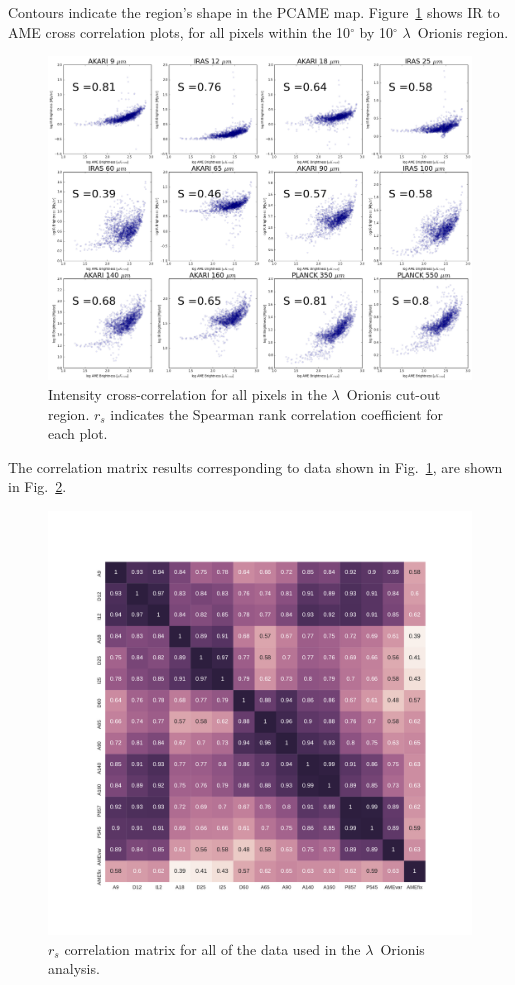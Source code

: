			Contours indicate the region's shape in the PCAME map. Figure~\ref{fig:orionis-corr} shows IR to AME cross correlation plots, for all pixels within the 10$^{\circ}$ by 10$^{\circ}$ $\lambda$~Orionis region.
        \begin{figure}
          \includegraphics[width=\textwidth]{../Plots/orionis_correlations_AME.png}
          \centering
          \caption{Intensity cross-correlation for all pixels in the $\lambda$~Orionis cut-out region.  $r_{s}$ indicates the Spearman rank correlation coefficient for each plot.}
          \label{fig:orionis-corr}
        \end{figure}
    The correlation matrix results corresponding to data shown in Fig.~\ref{fig:orionis-corr}, are shown in Fig.~\ref{fig:orionis-corr-matrix}.
        \begin{figure}
          \includegraphics[width=\textwidth]{../Plots/ch_lori/Lori_corrmatrix_I.pdf}
          \centering
          \caption{$r_{s}$ correlation matrix for all of the data used in the $\lambda$~Orionis analysis.}
          \label{fig:orionis-corr-matrix}
        \end{figure}
